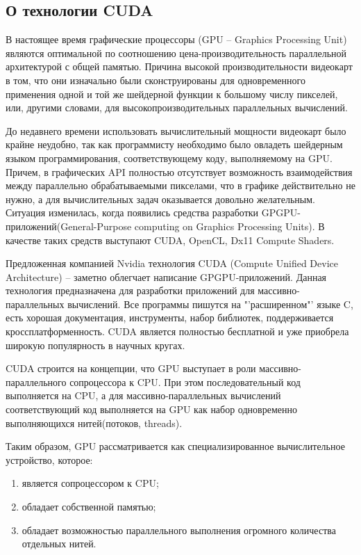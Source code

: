 \subsection{О технологии CUDA}
В настоящее время графические процессоры (GPU -- Graphics Processing Unit)
являются оптимальной по соотношению цена-производительность параллельной 
архитектурой с общей памятью. Причина высокой производительности видеокарт 
в том, что они изначально были сконструированы для одновременного применения
одной и той же шейдерной функции к большому числу пикселей, или, другими 
словами, для высокопроизводительных параллельных вычислений.

До недавнего времени использовать вычислительный мощности видеокарт было
крайне неудобно, так как программисту необходимо было
овладеть шейдерным языком программирования, соответствующему коду,
выполняемому на GPU. Причем, в графических API полностью отсутствует
возможность взаимодействия между параллельно обрабатываемыми пикселами,
что в графике действительно не нужно, а для вычислительных задач оказывается довольно
желательным. Ситуация изменилась, когда появились средства разработки
GPGPU-приложений(General-Purpose computing on Graphics Processing Units). 
В качестве таких средств выступают CUDA, OpenCL, Dx11 Compute
Shaders. 

Предложенная компанией Nvidia технология CUDA (Compute Unified Device Architecture) -- 
заметно облегчает написание GPGPU-приложений. Данная технология предназначена для
разработки приложений для массивно-параллельных вычислений. Все программы пишутся на
"'расширенном"' языке C, есть хорошая документация, инструменты, набор библиотек,
поддерживается кроссплатформенность. CUDA является полностью бесплатной и уже 
приобрела широкую популярность в научных кругах.

CUDA строится на концепции, что GPU выступает в роли массивно-параллельного
сопроцессора к CPU. При этом последовательный код выполняется на CPU,
а для массивно-параллельных вычислений соответствующий код выполняется на
GPU как набор одновременно выполняющихся нитей(потоков, threads).

Таким образом, GPU рассматривается как специализированное вычислительное устройство,
которое:
\begin{enumerate}
  \item является сопроцессором к CPU;
  \item обладает собственной памятью;
  \item обладает возможностью параллельного выполнения огромного количества отдельных
  нитей.
\end{enumerate}

